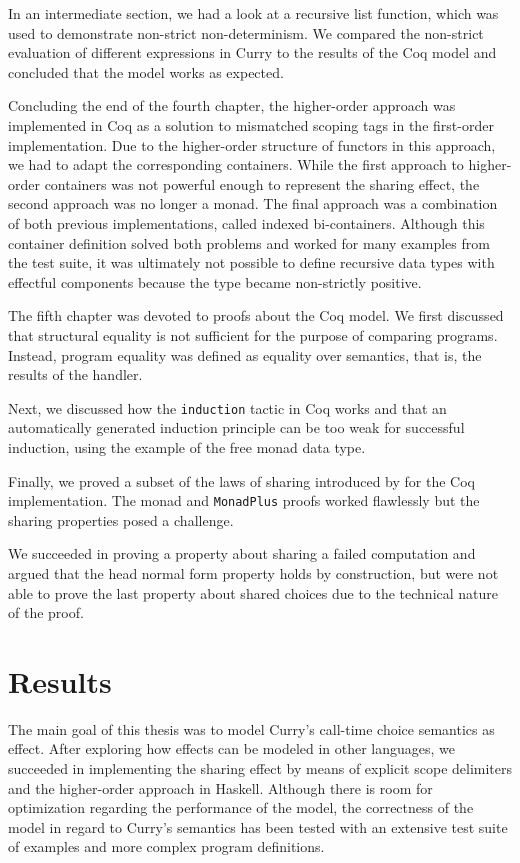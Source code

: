 \documentclass[a4paper, 11pt, fleqn, twoside, abstract=on]{scrreprt}
\newcommand{\hinl}[1]{\texttt{#1}}
\newcommand{\cinl}[1]{\texttt{#1}}
\begin{document}
In an intermediate section, we had a look at a recursive list function, which was used to demonstrate non-strict non-determinism.
We compared the non-strict evaluation of different expressions in Curry to the results of the Coq model and concluded that the model works as expected.

Concluding the end of the fourth chapter, the higher-order approach was implemented in Coq as a solution to mismatched scoping tags in the first-order implementation.
Due to the higher-order structure of functors in this approach, we had to adapt the corresponding containers.
While the first approach to higher-order containers was not powerful enough to represent the sharing effect, the second approach was no longer a monad.
The final approach was a combination of both previous implementations, called indexed bi-containers.
Although this container definition solved both problems and worked for many examples from the test suite, it was ultimately not possible to define recursive data types with effectful components because the type became non-strictly positive.

The fifth chapter was devoted to proofs about the Coq model.
We first discussed that structural equality is not sufficient for the purpose of comparing programs.
Instead, program equality was defined as equality over semantics, that is, the results of the handler.

Next, we discussed how the \cinl{induction} tactic in Coq works and that an automatically generated induction principle can be too weak for successful induction, using the example of the free monad data type.

Finally, we proved a subset of the laws of sharing introduced by \citet{fischer2009purely} for the Coq implementation.
The monad and \hinl{MonadPlus} proofs worked flawlessly but the sharing properties posed a challenge.

We succeeded in proving a property about sharing a failed computation and argued that the head normal form property holds by construction, but were not able to prove the last property about shared choices due to the technical nature of the proof.

\section{Results}
The main goal of this thesis was to model Curry's call-time choice semantics as effect.
After exploring how effects can be modeled in other languages, we succeeded in implementing the sharing effect by means of explicit scope delimiters and the higher-order approach in Haskell.
Although there is room for optimization regarding the performance of the model, the correctness of the model in regard to Curry's semantics has been tested with an extensive test suite of examples and more complex program definitions.
\end{document}

